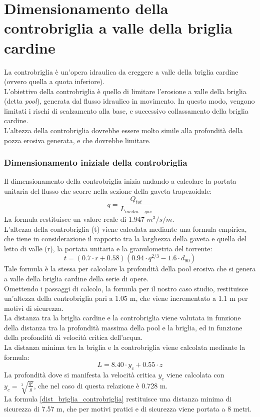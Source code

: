 \section{Dimensionamento della controbriglia a valle della briglia cardine}
La controbriglia è un'opera idraulica da ereggere a valle della briglia cardine (ovvero quella a quota inferiore).\\
L'obiettivo della controbriglia è quello di limitare l'erosione a valle della briglia (detta \textit{pool}), generata dal flusso idraulico in movimento. In questo modo, vengono limitati i rischi di scalzamento alla base, e successivo collassamento della briglia cardine.\\
L'altezza della controbriglia dovrebbe essere molto simile alla profondità della pozza erosiva generata, e che dovrebbe limitare.

\subsubsection{Dimensionamento iniziale della controbriglia}
Il dimensionamento della controbriglia inizia andando a calcolare la portata unitaria del flusso che scorre nella sezione della gaveta trapezoidale:
\begin{equation}
    q = \frac{Q_{tot}}{L_{media-gav}}
\end{equation}
La formula restituisce un valore reale di 1.947 $m^3/s/m$.\\
L'altezza della controbriglia (t) viene calcolata mediante una formula empirica, che tiene in considerazione il rapporto tra la larghezza della gaveta e quella del letto di valle (r), la portata unitaria e la granulometria del torrente:
\begin{equation}
    t= (0.7 \cdot r+0.58)(0.94 \cdot q^{2/3} - 1.6 \cdot d_{90})
\end{equation}
Tale formula è la stessa per calcolare la profondità della pool erosiva che si genera a valle della briglia cardine della serie di opere.\\
Omettendo i passaggi di calcolo, la formula per il nostro caso studio, restituisce un'altezza della controbriglia pari a 1.05 m, che viene incrementato a 1.1 m per motivi di sicurezza.\\
La distanza tra la briglia cardine e la controbriglia viene valutata in funzione della distanza tra la profondità massima della pool e la briglia, ed in funzione della profondità di velocità critica dell'acqua.\\
La distanza minima tra la briglia e la controbriglia viene calcolata mediante la formula:
\begin{equation}
    L= 8.40 \cdot y_c + 0.55 \cdot z
    \label{dist_briglia_controbriglia}
\end{equation}
La profondità dove si manifesta la velocità critica $y_c$ viene calcolata con $y_c = \sqrt[3]{\frac{q^2}{g}}$, che nel caso di questa relazione è 0.728 m.\\
La formula \ref{dist_briglia_controbriglia} restituisce una distanza minima di sicurezza di 7.57 m, che per motivi pratici e di sicurezza viene portata a 8 metri.